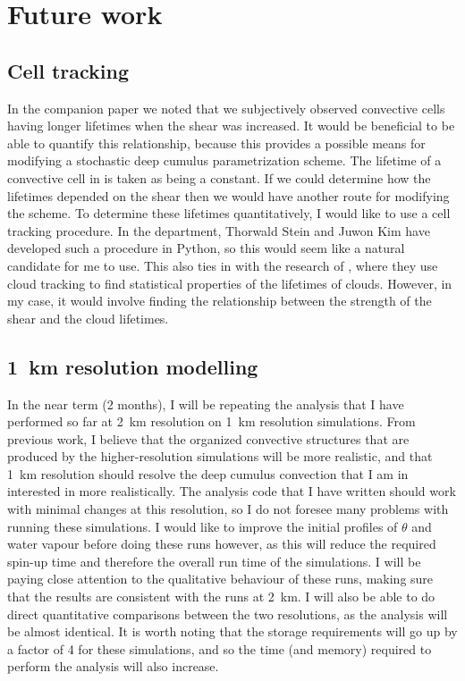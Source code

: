\documentclass[11pt,a4paper]{article}
\begin{document}
\section{Future work}

\subsection{Cell tracking}
\label{sec:cell_tracking}

In the companion paper we noted that we subjectively observed convective cells having longer lifetimes when the shear was increased. It would be beneficial to be able to quantify this relationship, because this provides a possible means for modifying a stochastic deep cumulus parametrization scheme. The lifetime of a convective cell in \cite{plant2008stochastic} is taken as being a constant. If we could determine how the lifetimes depended on the shear then we would have another route for modifying the scheme. To determine these lifetimes quantitatively, I would like to use a cell tracking procedure. In the department, Thorwald Stein and Juwon Kim have developed such a procedure in Python, so this would seem like a natural candidate for me to use. This also ties in with the research of \cite{plant2009statistical}, where they use cloud tracking to find statistical properties of the lifetimes of clouds. However, in my case, it would involve finding the relationship between the strength of the shear and the cloud lifetimes.

\subsection{\SI{1}{km} resolution modelling}
\label{sec:1km_res}

In the near term (2 months), I will be repeating the analysis that I have performed so far at \SI{2}{km} resolution on \SI{1}{km} resolution simulations. From previous work, I believe that the organized convective structures that are produced by the higher-resolution simulations will be more realistic, and that \SI{1}{km} resolution should resolve the deep cumulus convection that I am in interested in more realistically. The analysis code that I have written should work with minimal changes at this resolution, so I do not foresee many problems with running these simulations. I would like to improve the initial profiles of $\theta$ and water vapour before doing these runs however, as this will reduce the required spin-up time and therefore the overall run time of the simulations. I will be paying close attention to the qualitative behaviour of these runs, making sure that the results are consistent with the runs at \SI{2}{km}. I will also be able to do direct quantitative comparisons between the two resolutions, as the analysis will be almost identical. It is worth noting that the storage requirements will go up by a factor of 4 for these simulations, and so the time (and memory) required to perform the analysis will also increase.
\end{document}
